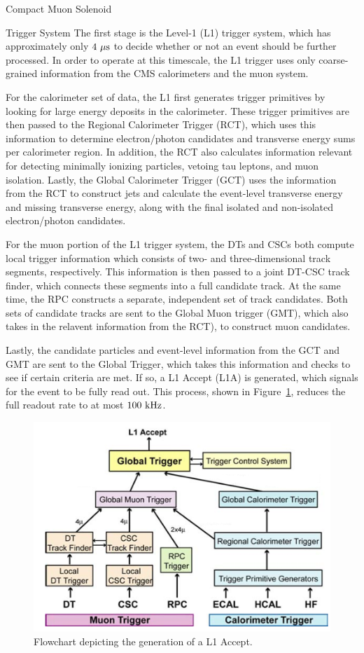 \begin{section}{Compact Muon Solenoid}
\begin{subsection}{Trigger System}
The first stage is the Level-1 (L1) trigger system, which has approximately only $4~\mu\mathrm{s}$ to decide whether or not an event should be further processed. 
In order to operate at this timescale, the L1 trigger uses only coarse-grained information from the CMS calorimeters and the muon system.

For the calorimeter set of data, the L1 first generates trigger primitives by looking for large energy deposits in the calorimeter.
These trigger primitives are then passed to the Regional Calorimeter Trigger (RCT), which uses this information to determine electron/photon candidates and transverse energy sums per calorimeter region.
In addition, the RCT also calculates information relevant for detecting minimally ionizing particles, vetoing tau leptons, and muon isolation.
Lastly, the Global Calorimeter Trigger (GCT) uses the information from the RCT to construct jets and calculate the event-level transverse energy and missing transverse energy, along with the final isolated and non-isolated electron/photon candidates.

For the muon portion of the L1 trigger system, the DTs and CSCs both compute local trigger information which consists of two- and three-dimensional track segments, respectively.
This information is then passed to a joint DT-CSC track finder, which connects these segments into a full candidate track.
At the same time, the RPC constructs a separate, independent set of track candidates.
Both sets of candidate tracks are sent to the Global Muon trigger (GMT), which also takes in the relavent information from the RCT), to construct muon candidates.

Lastly, the candidate particles and event-level information from the GCT and GMT are sent to the Global Trigger, which takes this information and checks to see if certain criteria are met.
If so, a L1 Accept (L1A) is generated, which signals for the event to be fully read out.
This process, shown in Figure~\ref{fig:cms_trigger}, reduces the full readout rate to at most $100~\mathrm{kHz}$.

\begin{figure}[tbp!]
\begin{center}
\includegraphics[angle=0,width=0.80\columnwidth]{fig/cms_trigger.png}
\end{center}
\caption{Flowchart depicting the generation of a L1 Accept.~\cite{1748-0221-3-08-S08004}}
\label{fig:cms_trigger}
\end{figure}


\end{subsection}
\end{section}
